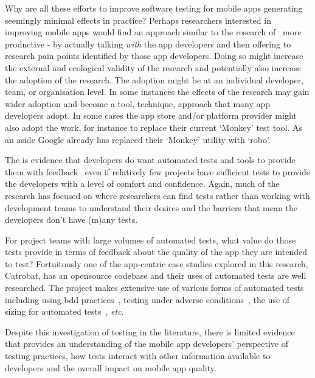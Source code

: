Why are all these efforts to improve software testing for mobile apps generating seemingly minimal effects in practice? Perhaps researchers interested in improving mobile apps would find an approach similar to the research of~ more productive - by actually talking \emph{with} the app developers and then offering to research pain points identified by those app developers. Doing so might increase the external and ecological validity of the research and potentially also increase the adoption of the research. The adoption might be at an individual developer, team, or organisation level. In some instances the effects of the research may gain wider adoption and become a tool, technique, approach that many app developers adopt. In some cases the app store and/or platform provider might also adopt the work, for instance to replace their current `Monkey' test tool. As an aside Google already has replaced their `Monkey' utility with `robo'.

The is evidence that developers do want automated tests and tools to provide them with feedback~ even if relatively few projects have sufficient tests to provide the developers with a level of comfort and confidence. Again, much of the research has focused on where researchers can find tests rather than working with development teams to understand their desires and the barriers that mean the developers don't have (m)any tests.

For project teams with large volumes of automated tests, what value do those tests provide in terms of feedback about the quality of the app they are intended to test? Fortuitously one of the app-centric case studies explored in this research, Catrobat, has an opensource codebase and their uses of automated tests are well researched. The  project makes extensive use of various forms of automated tests including using \Gls{bdd} practices~, testing under adverse conditions~, the use of sizing for automated tests~, \emph{etc}. %

Despite this investigation of testing in the literature, there is limited evidence that provides an understanding of the mobile app developers' perspective of testing practices, how tests interact with other information available to developers and the overall impact on mobile app quality.


